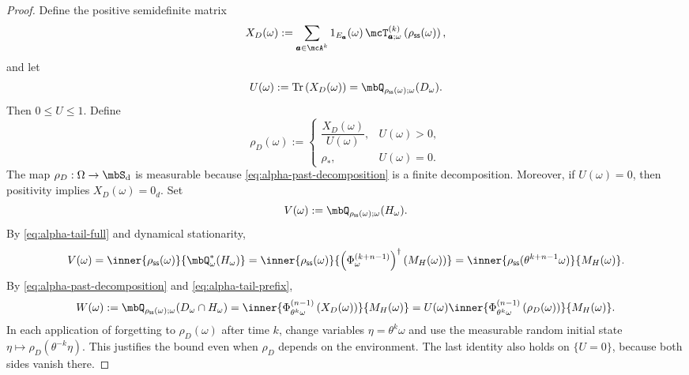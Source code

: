 \documentclass[a4paper]{article}
\numberwithin{equation}{section}   %
\theoremstyle{plain}   %
\theoremstyle{plain}   %
\theoremstyle{examplestyle}
\DeclareMathOperator{\states}{\mbS_d}   %
\newcommand{\adj}{^\dagger}         %
\newcommand{\s}{\rho_{\mathsf{ss}}}     %
\renewcommand{\tr}[1]{\operatorname{Tr}\left(#1\right)} %
\begin{document}
\begin{proof}
            Define the positive semidefinite matrix
            \[
                X_D(\omega)
                :=
                \sum_{\pmb a\in\mcA^k}
                1_{E_{\pmb a}}(\omega)\,
                \mcT_{\pmb a;\omega}^{(k)}
                \left(\s(\omega)\right),
            \]
            and let
            \[
                U(\omega)
                :=
                \tr{X_D(\omega)}
                =
                \mbQ_{\s(\omega);\omega}(D_\omega).
            \]
            Then \(0\le U\le1\). Define
            \[
                \rho_D(\omega)
                :=
                \begin{cases}
                    \dfrac{X_D(\omega)}{U(\omega)},
                        & U(\omega)>0,\\[1em]
                    \rho_\ast,
                        & U(\omega)=0.
                \end{cases}
            \]
            The map \(\rho_D:\Omega\to\states\) is measurable because  \eqref{eq:alpha-past-decomposition} is a finite decomposition.
            Moreover, if \(U(\omega)=0\), then positivity implies \(X_D(\omega)=0_d\).
            Set
            \[
                V(\omega)
                :=
                \mbQ_{\s(\omega);\omega}(H_\omega).
            \]
            By \eqref{eq:alpha-tail-full} and dynamical stationarity,
            \begin{equation}
            \label{eq:alpha-V}
                V(\omega)
                =
                \inner{\s(\omega)}{\mbQ^*_{\omega}(H_\omega)}
                =
                \inner{\s(\omega)}{\left(\Phi^{(k+n-1)}_\omega\right)\adj (M_H(\omega))}
                =
                \inner{
                    \s(\theta^{k+n-1}\omega)
                }{
                    M_H(\omega)
                }.
            \end{equation}
            By \eqref{eq:alpha-past-decomposition} and \eqref{eq:alpha-tail-prefix},
            \begin{align}
                W(\omega)
                :=
                \mbQ_{\s(\omega);\omega}
                (D_\omega\cap H_\omega)
                =
                \inner{
                    \Phi_{\theta^k\omega}^{(n-1)}
                    \left(X_D(\omega)\right)
                }{
                    M_H(\omega)
                }
                =
                U(\omega)
                \inner{
                    \Phi_{\theta^k\omega}^{(n-1)}
                    \left(\rho_D(\omega)\right)
                }{
                    M_H(\omega)
                }.
                \label{eq:alpha-W}
            \end{align}
            In each application of forgetting to $\rho_D(\omega)$ after time $k$, change variables $\eta=\theta^k\omega$ and use the measurable random initial state $\eta\mapsto\rho_D(\theta^{-k}\eta)$. This justifies the bound even when $\rho_D$ depends on the environment.
            The last identity also holds on \(\{U=0\}\), because both sides
            vanish there.
        

\end{proof}
\end{document}
